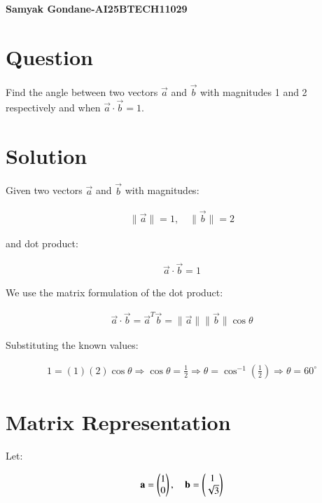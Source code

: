 \documentclass{article}
\begin{document}
\begin{center}
\large
    \textbf{Samyak Gondane-AI25BTECH11029}
\end{center}
\date{}

\section*{Question}
Find the angle between two vectors $\vec{a}$ and $\vec{b}$ with magnitudes 1 and 2 respectively and when $\vec{a}\cdot\vec{b} = 1$.

\section*{Solution}
Given two vectors $\vec{a}$ and $\vec{b}$ with magnitudes:


\begin{align}
\|\vec{a}\| = 1, \quad \|\vec{b}\| = 2
\end{align}


and dot product:


\begin{align}
\vec{a} \cdot \vec{b} = 1
\end{align}



We use the matrix formulation of the dot product:


\begin{align}
\vec{a} \cdot \vec{b} = \vec{a}^T \vec{b} = \|\vec{a}\| \|\vec{b}\| \cos\theta
\end{align}



Substituting the known values:


\begin{align}
1 = (1)(2)\cos\theta \Rightarrow \cos\theta = \frac{1}{2}
\Rightarrow \theta = \cos^{-1}\left(\frac{1}{2}\right)
\Rightarrow \theta = 60^\circ
\end{align}



\section*{Matrix Representation}

Let:


\begin{align}
\mathbf{a} = \begin{pmatrix}1 \\ 0\end{pmatrix}, \quad
\mathbf{b} = \begin{pmatrix}1 \\ \sqrt{3}\end{pmatrix}
\end{align}
\end{document}
